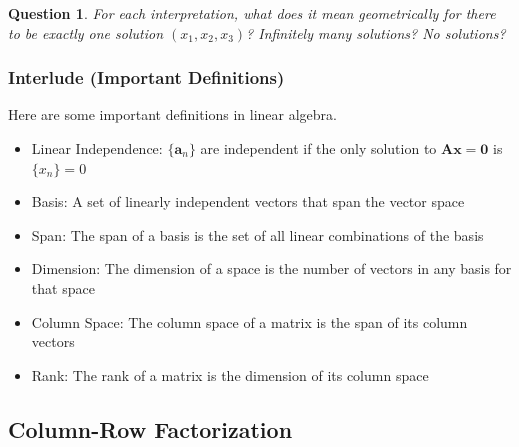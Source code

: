 \documentclass[11pt]{scrartcl}
\theoremstyle{plain}
\newtheorem*{question}{Question}
\theoremstyle{definition}
\theoremstyle{remark}
\begin{document}
\begin{question}
    For each interpretation, what does it mean geometrically for there to be exactly one solution 
    $(x_{1},x_{2},x_{3})$? Infinitely many solutions? No solutions?
\end{question}

\subsubsection{Interlude (Important Definitions)}

Here are some important definitions in linear algebra.

\begin{itemize}
    \item Linear Independence: $\{\mathbf{a}_{n}\}$ are independent if the only solution to $\mathbf{A}
    \mathbf{x}=\mathbf{0}$ is $\{x_{n}\}=0$
    \item Basis: A set of linearly independent vectors that span the vector space
    \item Span: The span of a basis is the set of all linear combinations of the basis %
    \item Dimension: The dimension of a space is the number of vectors in any basis for that space
    \item Column Space: The column space of a matrix is the span of its column vectors
    \item Rank: The rank of a matrix is the dimension of its column space
\end{itemize}

\subsection{Column-Row Factorization}
\end{document}
